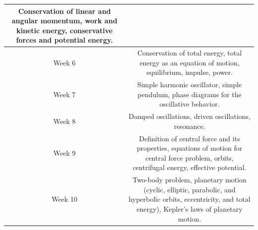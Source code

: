 \documentclass[11pt]{article}
\begin{document}
\begin{table}[h!]
\begin{tabular}{ | c | c | }
\begin{minipage}{.85\textwidth}
	\vspace{1mm}
	Conservation of linear and angular momentum, work and kinetic energy, conservative forces and potential energy. 
	\vspace{1mm}

\end{minipage} \\
\hline
Week 6 & \begin{minipage}{.85\textwidth}

	\vspace{1mm}
	Conservation of total energy, total energy as an equation of motion, equilibrium, impulse, power.
	\vspace{1mm}

\end{minipage} \\
\hline
Week 7 & \begin{minipage}{.85\textwidth}

	\vspace{1mm}
	Simple harmonic oscillator, simple pendulum, phase diagrams for the oscillative behavior.
	\vspace{1mm}

\end{minipage} \\
\hline
Week 8 & \begin{minipage}{.85\textwidth}

	\vspace{1mm}
	Damped oscillations, driven oscillations, resonance.
	\vspace{1mm}

\end{minipage} \\
\hline
Week 9 & \begin{minipage}{.85\textwidth}

	\vspace{1mm}
	Definition of central force and its properties, equations of motion for central force problem, orbits, centrifugal energy, effective potential.
	\vspace{1mm}

\end{minipage} \\
\hline
Week 10 & \begin{minipage}{.85\textwidth}

	\vspace{1mm}
	Two-body problem, planetary motion (cyclic, elliptic, parabolic, and hyperbolic orbits, eccentricity, and total energy), Kepler's laws of planetary motion.
	\vspace{1mm}


\end{minipage}
\end{tabular}
\end{table}
\end{document}
